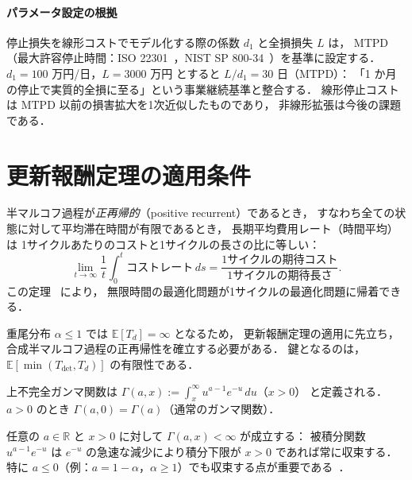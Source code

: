 \documentclass[12pt,a4paper]{article}
\theoremstyle{plain}
\theoremstyle{definition}
\theoremstyle{remark}
\newcommand{\E}{\mathbb{E}}
\newcommand{\Tdet}{T_{\mathrm{det}}}
\begin{document}
\paragraph{パラメータ設定の根拠}
停止損失を線形コストでモデル化する際の係数 $d_1$ と全損損失 $L$ は，
MTPD（最大許容停止時間：ISO 22301~\cite{iso22301}，NIST SP 800-34~\cite{nist80034}）を基準に設定する．
$d_1=100$ 万円/日，$L=3000$ 万円 とすると $L/d_1=30$ 日（MTPD）：
「1 か月の停止で実質的全損に至る」という事業継続基準と整合する．
線形停止コストは MTPD 以前の損害拡大を1次近似したものであり，
非線形拡張は今後の課題である．

\section{更新報酬定理の適用条件}
\label{sec:renewal}

\begin{tcolorbox}[mathbox, title={更新報酬定理（Renewal Reward Theorem）}]
半マルコフ過程が\emph{正再帰的}（positive recurrent）であるとき，
すなわち全ての状態に対して平均滞在時間が有限であるとき，
長期平均費用レート（時間平均）は 1サイクルあたりのコストと1サイクルの長さの比に等しい：
\[
\lim_{t\to\infty}\frac{1}{t}\int_0^t \text{コストレート}\,ds
=\frac{\text{1サイクルの期待コスト}}{\text{1サイクルの期待長さ}}.
\]
この定理~\cite{ross2014,cox1962,karlin1975,asmussen2003} により，
無限時間の最適化問題が1サイクルの最適化問題に帰着できる．
\end{tcolorbox}

重尾分布 $\alpha\le1$ では $\E[T_d]=\infty$ となるため，
更新報酬定理の適用に先立ち，合成半マルコフ過程の正再帰性を確立する必要がある．
鍵となるのは，$\E[\min(\Tdet,T_d)]$ の有限性である．

\begin{tcolorbox}[keybox, title={上不完全ガンマ関数（Upper Incomplete Gamma Function）}]
上不完全ガンマ関数は
$\Gamma(a,x):=\int_x^\infty u^{a-1}e^{-u}\,du$（$x>0$）
と定義される．$a>0$ のとき $\Gamma(a,0)=\Gamma(a)$（通常のガンマ関数）．

任意の $a\in\mathbb{R}$ と $x>0$ に対して $\Gamma(a,x)<\infty$ が成立する：
被積分関数 $u^{a-1}e^{-u}$ は $e^{-u}$ の急速な減少により積分下限が $x>0$ であれば常に収束する．
特に $a\le0$（例：$a=1-\alpha$，$\alpha\ge1$）でも収束する点が重要である~\cite{abramowitz1965,nist_dlmf}．
\end{tcolorbox}
\end{document}
